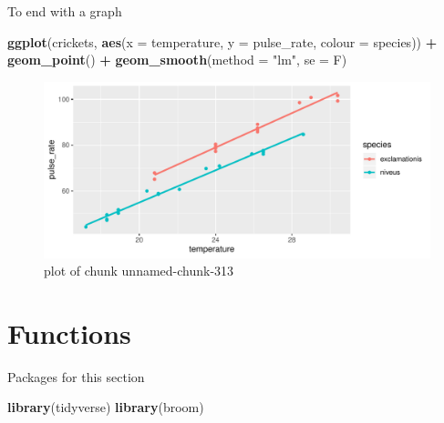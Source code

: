 \documentclass[ignorenonframetext,]{beamer}
\newenvironment{Shaded}{\begin{snugshade}}{\end{snugshade}}
\newcommand{\DataTypeTok}[1]{\textcolor[rgb]{0.13,0.29,0.53}{#1}}
\newcommand{\KeywordTok}[1]{\textcolor[rgb]{0.13,0.29,0.53}{\textbf{#1}}}
\newcommand{\NormalTok}[1]{#1}
\newcommand{\OperatorTok}[1]{\textcolor[rgb]{0.81,0.36,0.00}{\textbf{#1}}}
\newcommand{\StringTok}[1]{\textcolor[rgb]{0.31,0.60,0.02}{#1}}
\begin{document}
\begin{frame}[fragile]{To end with a graph}
\protect\hypertarget{to-end-with-a-graph}{}

\begin{Shaded}
\begin{Highlighting}[]
\KeywordTok{ggplot}\NormalTok{(crickets, }\KeywordTok{aes}\NormalTok{(}\DataTypeTok{x =}\NormalTok{ temperature, }\DataTypeTok{y =}\NormalTok{ pulse_rate,}
  \DataTypeTok{colour =}\NormalTok{ species)) }\OperatorTok{+}
\StringTok{  }\KeywordTok{geom_point}\NormalTok{() }\OperatorTok{+}\StringTok{ }\KeywordTok{geom_smooth}\NormalTok{(}\DataTypeTok{method =} \StringTok{"lm"}\NormalTok{, }\DataTypeTok{se =}\NormalTok{ F)}
\end{Highlighting}
\end{Shaded}

\begin{figure}
\centering
\includegraphics{figure/unnamed-chunk-313-1.pdf}
\caption{plot of chunk unnamed-chunk-313}
\end{figure}

\end{frame}

\hypertarget{functions}{%
\section{Functions}\label{functions}}

\begin{frame}[fragile]{Packages for this section}
\protect\hypertarget{packages-for-this-section-8}{}

\begin{Shaded}
\begin{Highlighting}[]
\KeywordTok{library}\NormalTok{(tidyverse)}
\KeywordTok{library}\NormalTok{(broom)}
\end{Highlighting}
\end{Shaded}

\end{frame}
\end{document}
